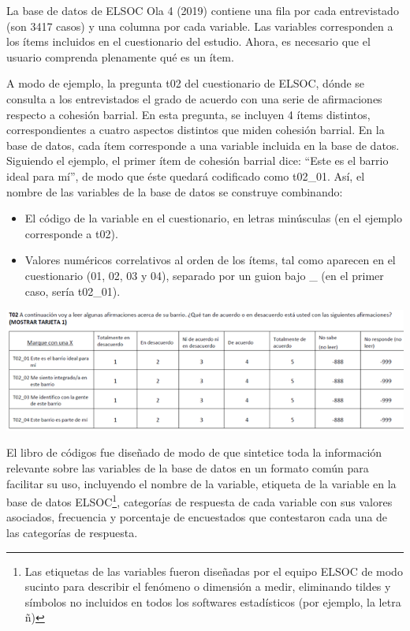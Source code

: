 \documentclass[
]{book}
\providecommand{\tightlist}{%
  \setlength{\itemsep}{0pt}\setlength{\parskip}{0pt}}
\begin{document}
La base de datos de ELSOC Ola 4 (2019) contiene una fila por cada entrevistado (son 3417 casos) y una columna por cada variable. Las variables corresponden a los ítems incluidos en el cuestionario del estudio. Ahora, es necesario que el usuario comprenda plenamente qué es un ítem.

A modo de ejemplo, la pregunta t02 del cuestionario de ELSOC, dónde se consulta a los entrevistados el grado de acuerdo con una serie de afirmaciones respecto a cohesión barrial. En esta pregunta, se incluyen 4 ítems distintos, correspondientes a cuatro aspectos distintos que miden cohesión barrial. En la base de datos, cada ítem corresponde a una variable incluida en la base de datos. Siguiendo el ejemplo, el primer ítem de cohesión barrial dice: ``Este es el barrio ideal para mí'', de modo que éste quedará codificado como t02\_01. Así, el nombre de las variables de la base de datos se construye combinando:

\begin{itemize}
\tightlist
\item
  El código de la variable en el cuestionario, en letras minúsculas (en el ejemplo corresponde a t02).
\item
  Valores numéricos correlativos al orden de los ítems, tal como aparecen en el cuestionario (01, 02, 03 y 04), separado por un guion bajo \_ (en el primer caso, sería t02\_01).
\end{itemize}

\begin{center}\includegraphics[width=0.9\linewidth,height=0.9\textheight]{imagenes/t02} \end{center}

El libro de códigos fue diseñado de modo de que sintetice toda la información relevante sobre las variables de la base de datos en un formato común para facilitar su uso, incluyendo el nombre de la variable, etiqueta de la variable en la base de datos ELSOC\footnote{Las etiquetas de las variables fueron diseñadas por el equipo ELSOC de modo sucinto para describir el fenómeno o dimensión a medir, eliminando tildes y símbolos no incluidos en todos los softwares estadísticos (por ejemplo, la letra ñ)}, categorías de respuesta de cada variable con sus valores asociados, frecuencia y porcentaje de encuestados que contestaron cada una de las categorías de respuesta.
\end{document}
